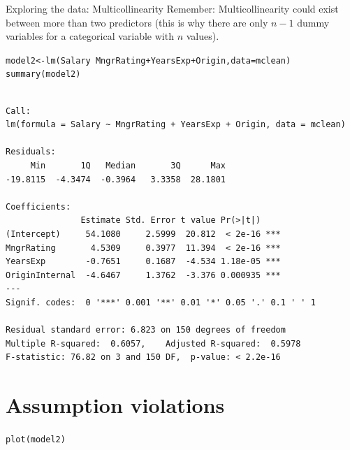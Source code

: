 \documentclass{beamer}\usepackage[]{graphicx}\usepackage[]{color}
\makeatletter
\newcommand{\hlopt}[1]{\textcolor[rgb]{1,0.894,0.769}{#1}}%
\newcommand{\hlstd}[1]{\textcolor[rgb]{1,0.894,0.769}{#1}}%
\newcommand{\hlkwb}[1]{\textcolor[rgb]{0.804,0.776,0.451}{#1}}%
\newcommand{\hlkwc}[1]{\textcolor[rgb]{0.78,0.941,0.545}{#1}}%
\newcommand{\hlkwd}[1]{\textcolor[rgb]{1,0.78,0.769}{#1}}%
\newenvironment{kframe}{%
 \def\at@end@of@kframe{}%
 \ifinner\ifhmode%
  \def\at@end@of@kframe{\end{minipage}}%
  \begin{minipage}{\columnwidth}%
 \fi\fi%
 \def\FrameCommand##1{\hskip\@totalleftmargin \hskip-\fboxsep
 \colorbox{shadecolor}{##1}\hskip-\fboxsep
     \hskip-\linewidth \hskip-\@totalleftmargin \hskip\columnwidth}%
 \MakeFramed {\advance\hsize-\width
   \@totalleftmargin\z@ \linewidth\hsize
   \@setminipage}}%
 {\par\unskip\endMakeFramed%
 \at@end@of@kframe}
\newenvironment{knitrout}{}{} %
\makeatother
\begin{document}
\begin{darkframes}
\begin{frame}[fragile]{Exploring the data: Multicollinearity}
      \alert{Remember:} Multicollinearity could exist between more than two predictors (this is why there are only $n-1$ dummy variables for a categorical variable with $n$ values).  
\end{frame}
    
\begin{frame}[fragile]%
      \fontsize{9}{9}\selectfont
\begin{knitrout}
\begin{kframe}
\begin{alltt}
\hlstd{model2} \hlkwb{<-} \hlkwd{lm}\hlstd{(Salary} \hlopt{~} \hlstd{MngrRating} \hlopt{+} \hlstd{YearsExp} \hlopt{+} \hlstd{Origin,} \hlkwc{data}\hlstd{=mclean)}
\hlkwd{summary}\hlstd{(model2)}
\end{alltt}
\begin{verbatim}

Call:
lm(formula = Salary ~ MngrRating + YearsExp + Origin, data = mclean)

Residuals:
     Min       1Q   Median       3Q      Max 
-19.8115  -4.3474  -0.3964   3.3358  28.1801 

Coefficients:
               Estimate Std. Error t value Pr(>|t|)    
(Intercept)     54.1080     2.5999  20.812  < 2e-16 ***
MngrRating       4.5309     0.3977  11.394  < 2e-16 ***
YearsExp        -0.7651     0.1687  -4.534 1.18e-05 ***
OriginInternal  -4.6467     1.3762  -3.376 0.000935 ***
---
Signif. codes:  0 '***' 0.001 '**' 0.01 '*' 0.05 '.' 0.1 ' ' 1

Residual standard error: 6.823 on 150 degrees of freedom
Multiple R-squared:  0.6057,	Adjusted R-squared:  0.5978 
F-statistic: 76.82 on 3 and 150 DF,  p-value: < 2.2e-16
\end{verbatim}
\end{kframe}
\end{knitrout}

      \lc
\end{frame}
    
    \section{Assumption violations}
    
\begin{frame}[fragile]
      \fontsize{9}{9}\selectfont

\begin{knitrout}
\begin{kframe}
\begin{alltt}
\hlkwd{plot}\hlstd{(model2)}
\end{alltt}
\end{kframe}



\end{knitrout}
\end{frame}
\end{darkframes}
\end{document}
